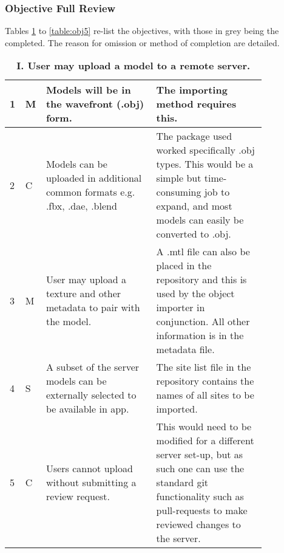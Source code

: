\documentclass[12pt, a4paper]{article}
\newcommand{\light}[1]{\textcolor{mygrey}{#1}}
\begin{document}
\subsubsection{Objective Full Review}
Tables \ref{table:obj1} to \ref{table:obj5} re-list the objectives, with those in \light{grey} being the completed. The reason for omission or method of completion are detailed.

\begin{table}[H]
\caption{\textbf{I. User may upload a model to a remote server.}}

\begin{tabular}{| p{0.02\linewidth} | p{0.02\linewidth} | p{0.4\linewidth} | p{0.4\linewidth} | }
\hline
1 & M & \light{Models will be in the wavefront (.obj) form. }            & The importing method requires this. \\ \hline
2 & C & Models can be uploaded in additional common formats e.g. .fbx, .dae, .blend & The package used worked specifically .obj types. This would be a simple but time-consuming job to expand, and most models can easily be converted to .obj. \\ \hline
3 & M & \light{User may upload a texture and other metadata to pair with the model.} & A .mtl file can also be placed in the repository and this is used by the object importer in conjunction. All other information is in the metadata file. \\ \hline
4 & S & \light{A subset of the server models can be externally selected to be available in app.} & The site list file in the repository contains the names of all sites to be imported. \\ \hline
5 & C & \light{Users cannot upload without submitting a review request.} & This would need to be modified for a different server set-up, but as such one can use the standard git functionality such as pull-requests to make reviewed changes to the server. \\ \hline
\end{tabular}
\label{table:obj1}
\end{table}
\end{document}
